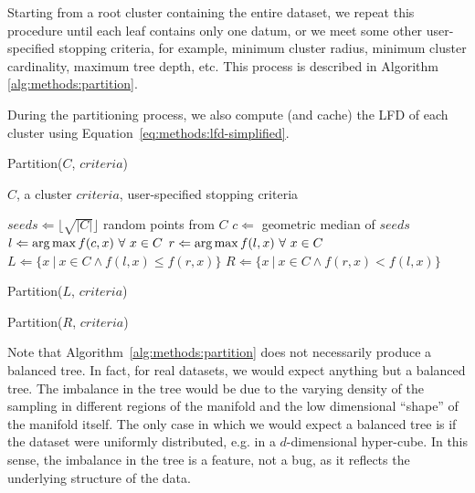 Starting from a root cluster containing the entire dataset, we repeat this procedure until each leaf contains only one datum, or we meet some other user-specified stopping criteria, for example, minimum cluster radius, minimum cluster cardinality, maximum tree depth, etc.
This process is described in Algorithm \ref{alg:methods:partition}.

During the partitioning process, we also compute (and cache) the LFD of each cluster using Equation~\ref{eq:methods:lfd-simplified}.

\begin{algorithm} %
    \caption{Partition($C$, $criteria$)} %
    \label{alg:methods:partition} %
    \begin{algorithmic} %
        \REQUIRE $C$, a cluster
        \REQUIRE $criteria$, user-specified stopping criteria

        \STATE $seeds \Leftarrow \lfloor \sqrt{|C|} \rfloor$ random points from $C$
        \STATE $c \Leftarrow$ geometric median of $seeds$
        \STATE $l \Leftarrow \operatorname*{arg\,max} f(c, x) \ \forall \ x \in C$
        \STATE $r \Leftarrow \argmax f(l, x) \ \forall \ x \in C$
        \STATE $L \Leftarrow \{x \ | \ x \in C \land f(l, x) \le f(r, x)\}$
        \STATE $R \Leftarrow \{x \ | \ x \in C \land f(r, x) < f(l, x)\}$
        
            \STATE Partition($L$, $criteria$)
        \ENDIF
        
            \STATE Partition($R$, $criteria$)
        \ENDIF
    \end{algorithmic}
\end{algorithm}

Note that Algorithm~\ref{alg:methods:partition} does not necessarily produce a balanced tree.
In fact, for real datasets, we would expect anything but a balanced tree.
The imbalance in the tree would be due to the varying density of the sampling in different regions of the manifold and the low dimensional ``shape'' of the manifold itself.
The only case in which we would expect a balanced tree is if the dataset were uniformly distributed, e.g. in a $d$-dimensional hyper-cube.
In this sense, the imbalance in the tree is a feature, not a bug, as it reflects the underlying structure of the data.


